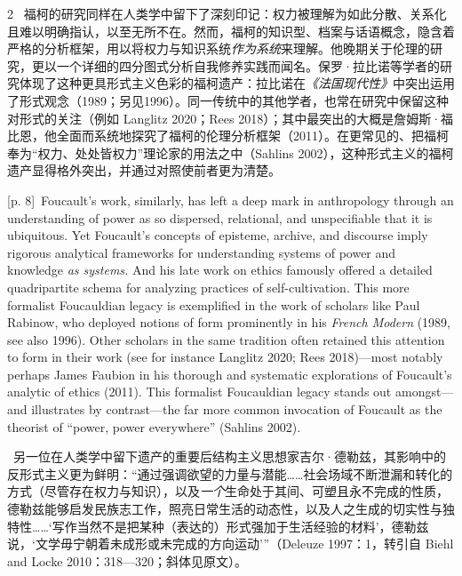 \documentclass[10pt,a4paper]{article}
\begin{document}
\begin{paracol}{2}
\switchcolumn*
{\scriptsize\color{gray} [p. 8]}\ 福柯的研究同样在人类学中留下了深刻印记：权力被理解为如此分散、关系化且难以明确指认，以至无所不在。然而，福柯的知识型、档案与话语概念，隐含着严格的分析框架，用以将权力与知识系统\textit{作为系统}来理解。他晚期关于伦理的研究，更以一个详细的四分图式分析自我修养实践而闻名。保罗·拉比诺等学者的研究体现了这种更具形式主义色彩的福柯遗产：拉比诺在\textit{《法国现代性》}中突出运用了形式观念（1989；另见1996）。同一传统中的其他学者，也常在研究中保留这种对形式的关注（例如 Langlitz 2020；Rees 2018）；其中最突出的大概是詹姆斯·福比恩，他全面而系统地探究了福柯的伦理分析框架（2011）。在更常见的、把福柯奉为“权力、处处皆权力”理论家的用法之中（Sahlins 2002），这种形式主义的福柯遗产显得格外突出，并通过对照使前者更为清楚。\par
\switchcolumn
{\scriptsize\color{gray} [p. 8]}\ Foucault’s work, similarly, has left a deep mark in anthropology through an understanding of power as so dispersed, relational, and unspecifiable that it is ubiquitous. Yet Foucault’s concepts of episteme, archive, and discourse imply rigorous analytical frameworks for understanding systems of power and knowledge \textit{as systems.} And his late work on ethics famously offered a detailed quadripartite schema for analyzing practices of self-cultivation. This more formalist Foucauldian legacy is exemplified in the work of scholars like Paul Rabinow, who deployed notions of form prominently in his \textit{French Modern} (1989, see also 1996). Other scholars in the same tradition often retained this attention to form in their work (see for instance Langlitz 2020; Rees 2018)—most notably perhaps James Faubion in his thorough and systematic explorations of Foucault’s analytic of ethics (2011). This formalist Foucauldian legacy stands out amongst—and illustrates by contrast—the far more common invocation of Foucault as the theorist of “power, power everywhere” (Sahlins 2002).\par
\switchcolumn*
{\scriptsize\color{gray} [p. 8]}\ 另一位在人类学中留下遗产的重要后结构主义思想家吉尔·德勒兹，其影响中的反形式主义更为鲜明：“通过强调欲望的力量与潜能……社会场域不断泄漏和转化的方式（尽管存在权力与知识），以及\textit{一个}生命处于其间、可塑且永不完成的性质，德勒兹能够启发民族志工作，照亮日常生活的动态性，以及人之生成的切实性与独特性……‘写作当然不是把某种（表达的）形式强加于生活经验的材料’，德勒兹说，‘文学毋宁朝着未成形或未完成的方向运动’”（Deleuze 1997：1，转引自 Biehl and Locke 2010：318—320；斜体见原文）。\par
\switchcolumn

\end{paracol}
\end{document}
